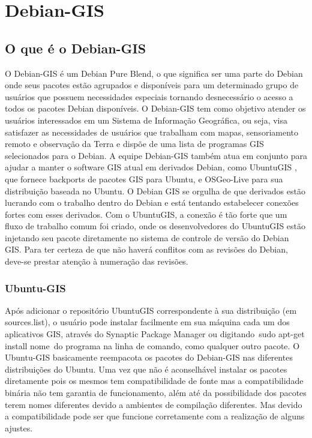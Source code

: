 \chapter{Debian-GIS}
\section{O que é o Debian-GIS}

O Debian-GIS é um Debian Pure Blend, o que significa ser uma parte do Debian onde seus pacotes estão agrupados e disponíveis para um determinado grupo de usuários que possuem necessidades especiais tornando desnecessário o acesso a todos os pacotes Debian disponíveis. O Debian-GIS tem como objetivo atender os usuários interessados em um Sistema de Informação Geográfica, ou seja, visa satisfazer as necessidades de usuários que trabalham com mapas, sensoriamento remoto e observação da Terra e dispõe de uma lista de programas GIS selecionados para o Debian.
A equipe Debian-GIS também atua em conjunto para ajudar a manter o software GIS atual em derivados Debian, como UbuntuGIS , que fornece backports de pacotes GIS para Ubuntu, e OSGeo-Live para sua distribuição baseada no Ubuntu.
O Debian GIS se orgulha de que derivados estão lucrando com o trabalho dentro do Debian e está tentando estabelecer conexões fortes com esses derivados. Com o UbuntuGIS, a conexão é tão forte que um fluxo de trabalho comum foi criado, onde os desenvolvedores do UbuntuGIS estão injetando seu pacote diretamente no sistema de controle de versão do Debian GIS. Para ter certeza de que não haverá conflitos com as revisões do Debian, deve-se prestar atenção à numeração das revisões.

\subsection{Ubuntu-GIS}

Após adicionar o repositório UbuntuGIS correspondente à sua distribuição (em sources.list), o usuário pode instalar facilmente em sua máquina cada um dos aplicativos GIS, através do Synaptic Package Manager ou digitando sudo apt-get install nome do programa na linha de comando, como qualquer outro pacote. 
O Ubuntu-GIS basicamente reempacota os pacotes do Debian-GIS nas diferentes distribuições do Ubuntu. Uma vez que não é aconselhável instalar os pacotes diretamente pois os mesmos tem compatibilidade de fonte mas a compatibilidade binária não tem garantia de funcionamento, além até da possibilidade dos pacotes terem nomes diferentes devido a ambientes de compilação diferentes. Mas devido a compatibilidade pode ser que funcione corretamente com a realização de alguns ajustes.

